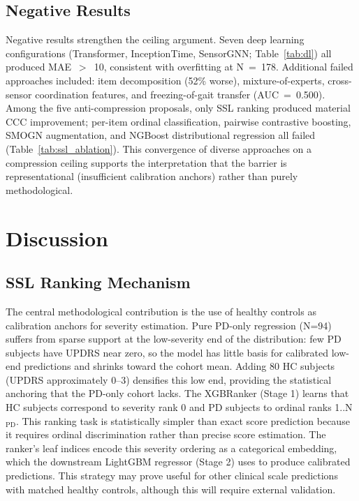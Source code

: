 \documentclass[11pt]{article}
\begin{document}
\subsection{Negative Results}

Negative results strengthen the ceiling argument. Seven deep learning configurations (Transformer, InceptionTime, SensorGNN; Table~\ref{tab:dl}) all produced MAE~$>$~10, consistent with overfitting at N~=~178. Additional failed approaches included: item decomposition (52\% worse), mixture-of-experts, cross-sensor coordination features, and freezing-of-gait transfer (AUC~=~0.500). Among the five anti-compression proposals, only SSL ranking produced material CCC improvement; per-item ordinal classification, pairwise contrastive boosting, SMOGN augmentation, and NGBoost distributional regression all failed (Table~\ref{tab:ssl_ablation}). This convergence of diverse approaches on a compression ceiling supports the interpretation that the barrier is representational (insufficient calibration anchors) rather than purely methodological.

\section{Discussion}

\subsection{SSL Ranking Mechanism}

The central methodological contribution is the use of healthy controls as calibration anchors for severity estimation. Pure PD-only regression (N=94) suffers from sparse support at the low-severity end of the distribution: few PD subjects have UPDRS near zero, so the model has little basis for calibrated low-end predictions and shrinks toward the cohort mean. Adding 80 HC subjects (UPDRS approximately 0--3) densifies this low end, providing the statistical anchoring that the PD-only cohort lacks. The XGBRanker (Stage 1) learns that HC subjects correspond to severity rank 0 and PD subjects to ordinal ranks 1..N$_{\text{PD}}$. This ranking task is statistically simpler than exact score prediction because it requires ordinal discrimination rather than precise score estimation. The ranker's leaf indices encode this severity ordering as a categorical embedding, which the downstream LightGBM regressor (Stage 2) uses to produce calibrated predictions. This strategy may prove useful for other clinical scale predictions with matched healthy controls, although this will require external validation.
\end{document}
